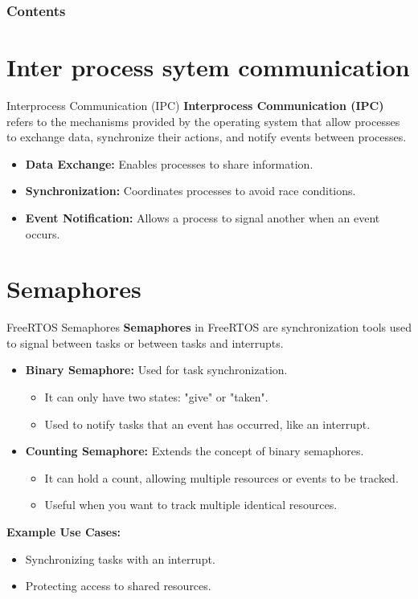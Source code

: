 \documentclass[10pt]{beamer}
\title[Universidad Panamericana]{}
\subtitle{FreeRTOS synchronization methods}
\author[]{Name}
\institute[ltonix@up.edu.mx]{Universidad Panamericana}
\date[Presentation \today]{Presentation \today}
\begin{document}
\frame{\titlepage}
\begin{frame}
\frametitle{Contents}
\tableofcontents
\end{frame}

\section{Inter process sytem communication}
\begin{frame}{Interprocess Communication (IPC)}
    \textbf{Interprocess Communication (IPC)} refers to the mechanisms provided by the operating system that allow processes to exchange data, synchronize their actions, and notify events between processes.
    \begin{itemize}
        \item \textbf{Data Exchange:} Enables processes to share information.
        \item \textbf{Synchronization:} Coordinates processes to avoid race conditions.
        \item \textbf{Event Notification:} Allows a process to signal another when an event occurs.
    \end{itemize}
\end{frame}

\section{Semaphores}

\begin{frame}{FreeRTOS Semaphores}
    \textbf{Semaphores} in FreeRTOS are synchronization tools used to signal between tasks or between tasks and interrupts.
    
    \begin{itemize}
        \item \textbf{Binary Semaphore:} Used for task synchronization.
        \begin{itemize}
            \item It can only have two states: "give" or "taken".
            \item Used to notify tasks that an event has occurred, like an interrupt.
        \end{itemize}
        
        \item \textbf{Counting Semaphore:} Extends the concept of binary semaphores.
        \begin{itemize}
            \item It can hold a count, allowing multiple resources or events to be tracked.
            \item Useful when you want to track multiple identical resources.
        \end{itemize}
\end{itemize}

\textbf{Example Use Cases:}
\begin{itemize}
    \item Synchronizing tasks with an interrupt.
    \item Protecting access to shared resources.
\end{itemize}
\end{frame}
\end{document}
